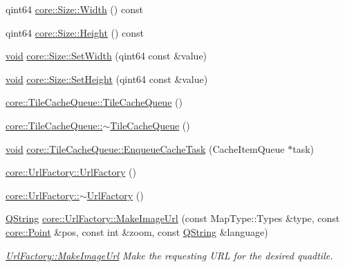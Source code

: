 \begin{DoxyCompactItemize}
\item 
qint64 \hyperlink{group___o_p_map_widget_ga57df26ac2174659d7a906e8d31a34080}{core\-::\-Size\-::\-Width} () const 
\item 
qint64 \hyperlink{group___o_p_map_widget_ga9c12f3b98a93a81fab566f35d93c7d20}{core\-::\-Size\-::\-Height} () const 
\item 
\hyperlink{group___u_a_v_objects_plugin_ga444cf2ff3f0ecbe028adce838d373f5c}{void} \hyperlink{group___o_p_map_widget_gae28441c62e671e06cff1065e13176f33}{core\-::\-Size\-::\-Set\-Width} (qint64 const \&value)
\item 
\hyperlink{group___u_a_v_objects_plugin_ga444cf2ff3f0ecbe028adce838d373f5c}{void} \hyperlink{group___o_p_map_widget_gaeb60d897c19a5a111737e862c17dadbd}{core\-::\-Size\-::\-Set\-Height} (qint64 const \&value)
\item 
\hyperlink{group___o_p_map_widget_gaf4b26a2fbfd128dce8b96fa82f4230dd}{core\-::\-Tile\-Cache\-Queue\-::\-Tile\-Cache\-Queue} ()
\item 
\hyperlink{group___o_p_map_widget_ga09862b0024b636bee196029e0a98cfc4}{core\-::\-Tile\-Cache\-Queue\-::$\sim$\-Tile\-Cache\-Queue} ()
\item 
\hyperlink{group___u_a_v_objects_plugin_ga444cf2ff3f0ecbe028adce838d373f5c}{void} \hyperlink{group___o_p_map_widget_gaa3b5dbe5d3c7b4f98f540bb4bb38f3d1}{core\-::\-Tile\-Cache\-Queue\-::\-Enqueue\-Cache\-Task} (\-Cache\-Item\-Queue $\ast$task)
\item 
\hyperlink{group___o_p_map_widget_gabc044615454cf1ce949b090b45a3b20d}{core\-::\-Url\-Factory\-::\-Url\-Factory} ()
\item 
\hyperlink{group___o_p_map_widget_ga67b13bc9e7c21c4fcc4471ddce351805}{core\-::\-Url\-Factory\-::$\sim$\-Url\-Factory} ()
\item 
\hyperlink{group___u_a_v_objects_plugin_gab9d252f49c333c94a72f97ce3105a32d}{\-Q\-String} \hyperlink{group___o_p_map_widget_ga7339895a709cbc83dfac87ec5e1a42ff}{core\-::\-Url\-Factory\-::\-Make\-Image\-Url} (const \-Map\-Type\-::\-Types \&type, const \hyperlink{structcore_1_1_point}{core\-::\-Point} \&pos, const int \&zoom, const \hyperlink{group___u_a_v_objects_plugin_gab9d252f49c333c94a72f97ce3105a32d}{\-Q\-String} \&language)
\begin{DoxyCompactList}\small\item\em \hyperlink{group___o_p_map_widget_ga7339895a709cbc83dfac87ec5e1a42ff}{\-Url\-Factory\-::\-Make\-Image\-Url} \-Make the requesting \-U\-R\-L for the desired quadtile. \end{DoxyCompactList}\item 

\end{DoxyCompactItemize}
